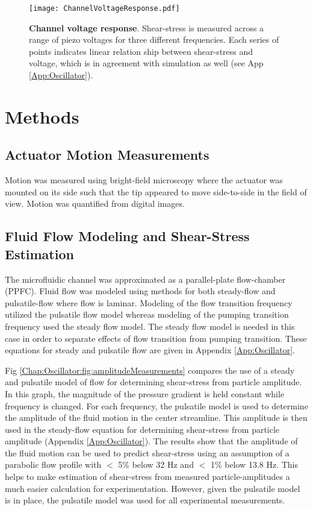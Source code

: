 \begin{figure}[!ht]
\centering
\texttt{[image: ChannelVoltageResponse.pdf]}
\caption{\textbf{Channel voltage response}. Shear-stress is measured across a range of piezo voltages for three different frequencies. Each series of points indicates linear relation ship between shear-stress and voltage, which is in agreement with simulation as well (see App \ref{App:Oscillator}).}
\label{Chap:Oscillator:fig:channelVoltageResponse}
\end{figure}

\section{Methods}
\subsection{Actuator Motion Measurements}
Motion was measured using bright-field microscopy where the actuator was mounted on its side such that the tip appeared to move side-to-side in the field of view. Motion was quantified from digital images.

\subsection{Fluid Flow Modeling and Shear-Stress Estimation}\label{Chap:Oscillator:sec:methods:shear}
The microfluidic channel was approximated as a parallel-plate flow-chamber (PPFC). Fluid flow was modeled using methods for both steady-flow and pulsatile-flow where flow is laminar. Modeling of the flow transition frequency utilized the pulsatile flow model whereas modeling of the pumping transition frequency used the steady flow model. The steady flow model is needed in this case in order to separate effects of flow transition from pumping transition. These equations for steady and pulsatile flow are given in Appendix \ref{App:Oscillator}. 

Fig \ref{Chap:Oscillator:fig:amplitudeMeasurements} compares the use of a steady and pulsatile model of flow for determining shear-stress from particle amplitude. In this graph, the magnitude of the pressure gradient is held constant while frequency is changed. For each frequency, the pulsatile model is used to determine the amplitude of the fluid motion in the center streamline. This amplitude is then used in the steady-flow equation for determining shear-stress from particle amplitude (Appendix \ref{App:Oscillator}). The results show that the amplitude of the fluid motion can be used to predict shear-stress using an assumption of a parabolic flow profile with $<$ 5\% below 32 Hz and $<$ 1\% below 13.8 Hz. This helps to make estimation of shear-stress from measured particle-amplitudes a much easier calculation for experimentation. However, given the pulsatile model is in place, the pulsatile model was used for all experimental measurements.

